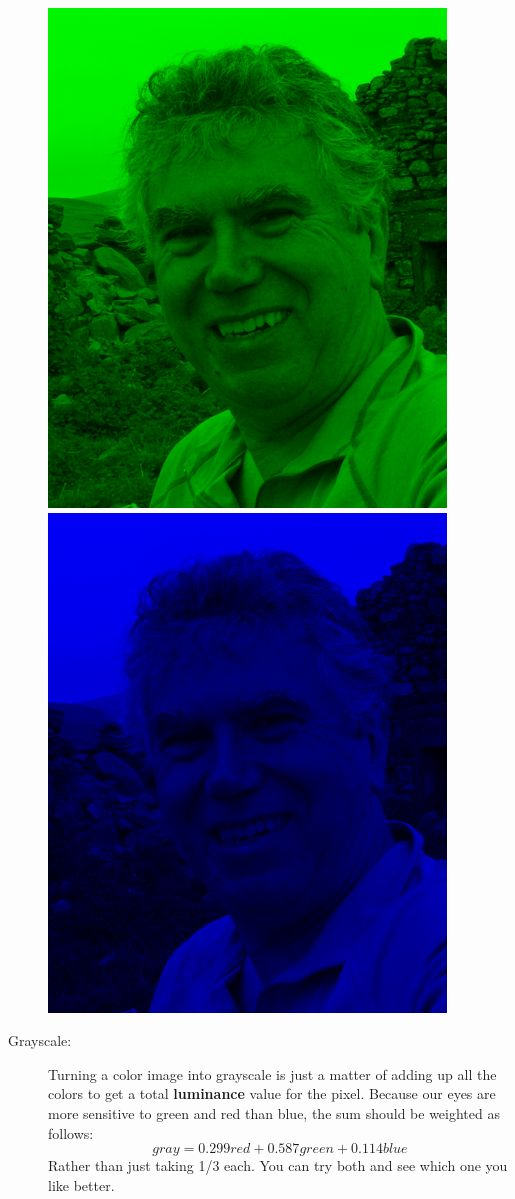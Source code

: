 \documentclass[12pt]{article}
\begin{document}
\begin{description}
\includegraphics[scale=0.25]{green.png}
\includegraphics[scale=0.25]{blue.png}

\item[Grayscale:]  Turning a color image into grayscale is just
a matter of adding up all the colors to get a total {\bf luminance}
value for the pixel.  Because our eyes are more sensitive to 
green and red than blue, the sum should be weighted as follows:
\[
gray=0.299red+0.587green+0.114blue
\]
Rather than just taking 1/3 each.
You can try both and see which one you like better.


\end{description}
\end{document}

